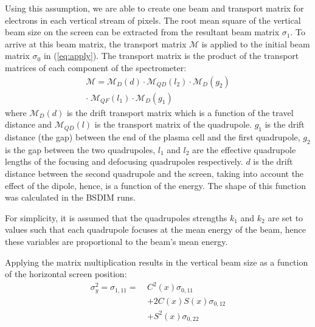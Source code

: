 Using this assumption, we are able to create one beam and transport matrix for
electrons in each vertical stream of pixels. The root mean square of the
vertical beam size on the screen can be extracted from the resultant beam matrix
\(\sigma_1\). To arrive at this beam matrix, the transport matrix
\(\mathcal{M}\) is applied to the initial beam matrix \(\sigma_0\) in
(\ref{eq:apply}). The transport matrix is the product of the transport matrices
of each component of the spectrometer:
\begin{equation}
	\begin{split}
		\mathcal{M} = \mathcal{M}_D(d) \cdot \mathcal{M}_{QD}(l_2) \cdot
		\mathcal{M}_D(g_2) \\
		\cdot\;\mathcal{M}_{QF}(l_1) \cdot \mathcal{M}_D(g_1)
	\end{split}
\end{equation}
where \(\mathcal{M}_D(d)\) is the drift transport matrix which is a function of
the travel distance and \(\mathcal{M}_{QD}(l)\) is the transport matrix of the
quadrupole. \(g_1\) is the drift distance (the gap) between the end of the
plasma cell and the first quadrupole, \(g_2\) is the gap between the two
quadrupoles, \(l_1\) and \(l_2\) are the effective quadrupole lengths of the
focusing and defocusing quadrupoles respectively. \(d\) is the drift distance
between the second quadrupole and the screen, taking into account the effect of
the dipole, hence, is a function of the energy. The shape of this function was
calculated in the BSDIM runs.

For simplicity, it is assumed that the quadrupoles strengths \(k_1\) and \(k_2\)
are set to values such that each quadrupole focuses at the mean energy of the
beam, hence these variables are proportional to the beam's mean energy.



Applying the matrix multiplication results in the vertical beam size as a
function of the horizontal screen position:
\begin{equation}
	\begin{split}
		\sigma_y^2 = \sigma_{1,11} =\: & C^2(x)\sigma_{0,11} \\
									&+ 2C(x)S(x)\sigma_{0,12} \\
									&+ S^2(x)\sigma_{0,22}
	\end{split}
\end{equation}


